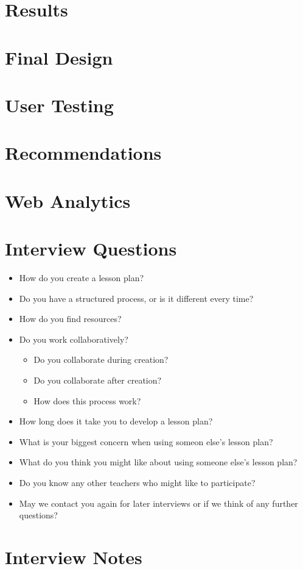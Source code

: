 \documentclass[10pt,letter]{article}
\begin{document}
\section{Results}

\section{Final Design}

\section{User Testing}

\section{Recommendations}

\section{Web Analytics}

\appendix

\section{Interview Questions}
\label{interview questions}
\begin{itemize}
	\item How do you create a lesson plan?

	\item Do you have a structured process, or is it different every time?

	\item How do you find resources?

	\item Do you work collaboratively?
	\begin{itemize}
		\item Do you collaborate during creation?

		\item Do you collaborate after creation?

		\item How does this process work?
	\end{itemize}

	\item How long does it take you to develop a lesson plan?

	\item What is your biggest concern when using someon else's lesson plan?

	\item What do you think you might like about using someone else's lesson
		plan?

	\item Do you know any other teachers who might like to participate?

	\item May we contact you again for later interviews or if we think of any
		further questions?
\end{itemize}

\section{Interview Notes}
\label{interview notes}
\end{document}
